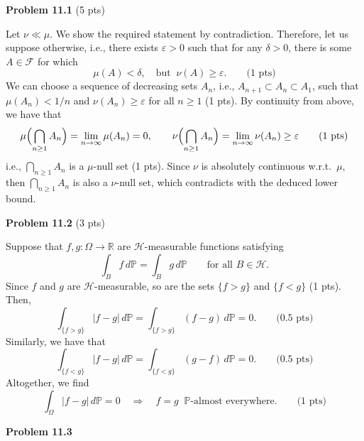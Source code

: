 \textbf{Problem 11.1} (5 pts)

Let $\nu\ll \mu$. We show the required statement by contradiction. Therefore, let us suppose otherwise, i.e., there exists $\varepsilon>0$ such that for any $\delta>0$, there is some $A\in\mathcal{F}$ for which
\[
	\mu(A)<\delta,\quad\text{but}\;\;\nu(A)\ge \varepsilon.\qquad\text{(1 pts)}
\]
We can choose a sequence of decreasing sets $A_n$, i.e., $A_{n+1}\subset A_n\subset A_1$, such that $\mu(A_n)<1/n$ and $\nu(A_n)\ge \varepsilon$ for all $n\ge 1$ (1 pts). By continuity from above, we have that
\[
	\mu\Bigl(\bigcap_{n\ge 1} A_n\Bigr) = \lim_{n\to\infty} \mu(A_n) = 0,\qquad \nu\Bigl(\bigcap_{n\ge 1} A_n\Bigr) = \lim_{n\to\infty} \nu(A_n) \ge \varepsilon\qquad \text{(1 pts)}
\]
i.e., $\bigcap_{n\ge 1} A_n$ is a $\mu$-null set (1 pts). Since $\nu$ is absolutely continuous w.r.t.\ $\mu$, then $\bigcap_{n\ge 1} A_n$ is also a $\nu$-null set, which contradicts with the deduced lower bound. 

\bigskip
\textbf{Problem 11.2} (3 pts)

Suppose that $f,g:\Omega\to\mathbb{R}$ are $\mathcal{H}$-measurable functions satisfying
\[
	\int_B f\,d\mathbb{P} = \int_B g\,d\mathbb{P} \qquad\text{for all $B\in\mathcal{H}$}.
\]
Since $f$ and $g$ are $\mathcal{H}$-measurable, so are the sets $\{f>g\}$ and $\{f<g\}$ (1 pts). Then,
\[
	\int_{\{f>g\}} |f-g| \,d\mathbb{P} = \int_{\{f>g\}} (f-g) \,d\mathbb{P} = 0.\qquad \text{(0.5 pts)}
\]
Similarly, we have that
\[
	\int_{\{f<g\}} |f-g| \,d\mathbb{P} = \int_{\{f<g\}} (g-f) \,d\mathbb{P} = 0.\qquad \text{(0.5 pts)}
\]
Altogether, we find
\[
	\int_\Omega |f-g| \,d\mathbb{P} = 0\quad\Longrightarrow\quad f=g\;\;\text{$\mathbb{P}$-almost everywhere.}\qquad \text{(1 pts)}
\]

\bigskip




\textbf{Problem 11.3}

